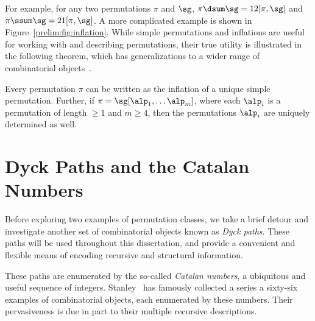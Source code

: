 \documentclass[12pt,twoside]{memoir}
\begin{document}
      For example, for any two permutations $\pi$ and $\sg$, $\pi \dsum \sg =
      12[\pi, \sg]$ and $\pi \ssum \sg = 21[\pi, \sg]$. A more complicated
      example is shown in Figure~\ref{prelim:fig:inflation}. While simple
      permutations and inflations are useful for working with and describing
      permutations, their true utility is illustrated in the following theorem,
      which has generalizations to a wider range of combinatorial
      objects~\cite{SubsDecomp}. 



      \begin{theorem}
        \label{thm:subsdecomp}
        Every permutation $\pi$ can be written as the inflation of a
        unique simple permutation. Further, if $\pi = \sg[\alp_1, \dots \alp_m]$,
        where each $\alp_i$ is a permutation of length $\geq 1$ and
        $m \geq 4$, then the permutations $\alp_i$ are uniquely determined as
        well. 
      \end{theorem}



  \section{Dyck Paths and the Catalan Numbers}

      Before exploring two examples of permutation classes, we take a brief
      detour and investigate another set of combinatorial objects known as 
      \emph{Dyck paths}. These paths will be used throughout this dissertation,
      and provide a convenient and flexible means of encoding recursive and
      structural information. 
      
      These paths are enumerated by the so-called
      \emph{Catalan numbers}, a ubiquitous and useful sequence of integers.
      Stanley~\cite{Stanley2} has famously collected a series a sixty-six
      examples of combinatorial objects, each enumerated by these numbers. Their
      pervasiveness is due in part to their multiple recursive descriptions. 
      
\end{document}
